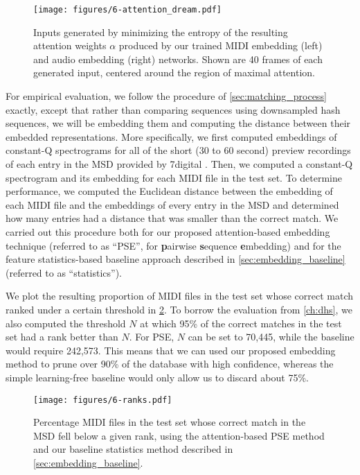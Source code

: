 \begin{figure}
  \texttt{[image: figures/6-attention\_dream.pdf]}
  \caption[Generated maximal attention inputs]{Inputs generated by minimizing the entropy of the resulting attention weights $\alpha$ produced by our trained MIDI embedding (left) and audio embedding (right) networks.
Shown are 40 frames of each generated input, centered around the region of maximal attention.}
  \label{fig:attention_dream}
\end{figure}

For empirical evaluation, we follow the procedure of \cref{sec:matching_process} exactly, except that rather than comparing sequences using downsampled hash sequences, we will be embedding them and computing the distance between their embedded representations.
More specifically, we first computed embeddings of constant-Q spectrograms for all of the short (30 to 60 second) preview recordings of each entry in the MSD provided by 7digital \cite{schindler2012facilitating}.
Then, we computed a constant-Q spectrogram and its embedding for each MIDI file in the test set.
To determine performance, we computed the Euclidean distance between the embedding of each MIDI file and the embeddings of every entry in the MSD and determined how many entries had a distance that was smaller than the correct match.
We carried out this procedure both for our proposed attention-based embedding technique (referred to as ``PSE'', for \textbf{p}airwise \textbf{s}equence \textbf{e}mbedding) and for the feature statistics-based baseline approach described in \cref{sec:embedding_baseline} (referred to as ``statistics'').

We plot the resulting proportion of MIDI files in the test set whose correct match ranked under a certain threshold in \cref{fig:embedding_ranks}.
To borrow the evaluation from \cref{ch:dhs}, we also computed the threshold $N$ at which 95\% of the correct matches in the test set had a rank better than $N$.
For PSE, $N$ can be set to 70,445, while the baseline would require 242,573.
This means that we can used our proposed embedding method to prune over 90\% of the database with high confidence, whereas the simple learning-free baseline would only allow us to discard about 75\%.

\begin{figure}
  \texttt{[image: figures/6-ranks.pdf]}
  \caption[Percentage of the test set below a given rank]{Percentage MIDI files in the test set whose correct match in the MSD fell below a given rank, using the attention-based PSE method and our baseline statistics method described in \cref{sec:embedding_baseline}.}
  \label{fig:embedding_ranks}
\end{figure}

